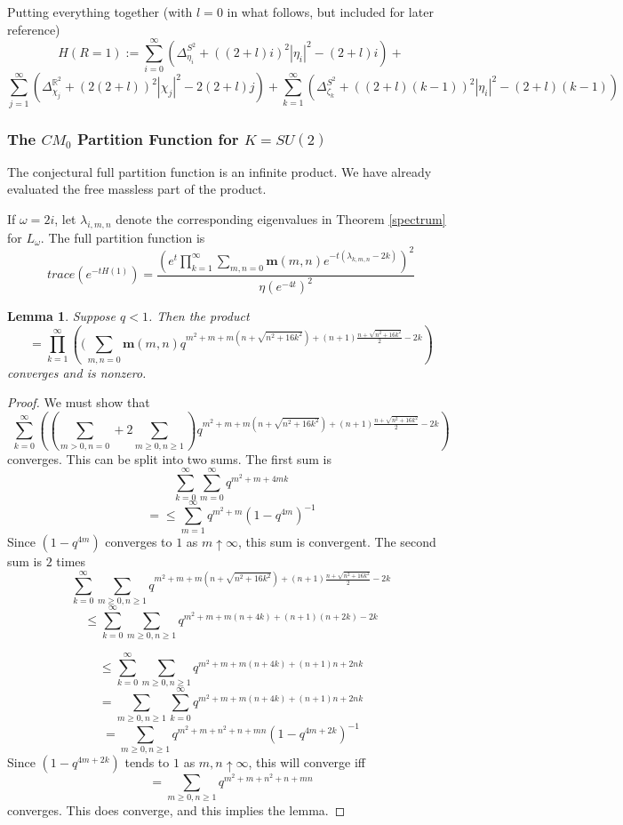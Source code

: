 \documentclass{amsart}
\newtheorem{lemma}{Lemma}
\theoremstyle{conjecture}
\theoremstyle{definition}
\theoremstyle{question}
\theoremstyle{questions}
\theoremstyle{remark}
\theoremstyle{remarks}
\theoremstyle{example}
\numberwithin{equation}{section}
\begin{document}
Putting everything together (with $l=0$ in what follows, but included for later reference)
\begin{equation}\label{SigmaHamiltonian}H(R=1):=\sum_{i=0}^{\infty}(\Delta^{S^2}_{\eta_i}+((2+l)i)^2|\eta_i|^2-(2+l)i)+
\end{equation}
$$
\sum_{j=1}^{\infty}(\Delta^{\mathbb R^2}_{\chi_j}+(2(2+l))^2|\chi_j|^2-2(2+l)j   )+
\sum_{k=1}^{\infty}(\Delta^{S^2}_{\zeta_k}+((2+l)(k-1))^2|\eta_i|^2-(2+l)(k-1))$$


\subsubsection{The $CM_0$ Partition Function for $K=SU(2)$}

The conjectural full partition function is an infinite product. We have already evaluated the free massless part of the product.

If $\omega=2i$, let $\lambda_{i,m,n}$ denote the corresponding eigenvalues
in Theorem \ref{spectrum} for $L_{\omega}$.
The full partition function is
$$trace(e^{-tH(1)})=\frac{\left(e^{t}\prod_{k=1}^{\infty}\sum_{m,n=0}\mathbf m(m,n)
e^{-t(\lambda_{k,m,n}-2k)}\right)^2}{\eta(e^{-4t})^2}$$

\begin{lemma} Suppose $q<1$. Then the product
$$=\prod_{k=1}^{\infty}\left((\sum_{m,n=0}\mathbf m(m,n)
q^{m^2+m+m(n+\sqrt{n^2+16k^2})+(n+1)\frac{n+\sqrt{n^2+16k^2}}{2}-2k}\right)$$
converges and is nonzero.
\end{lemma}


\begin{proof} We must show that
$$\sum_{k=0}^{\infty}\left((\sum_{m>0,n=0}+2\sum_{m\ge 0,n\ge 1})
q^{m^2+m+m(n+\sqrt{n^2+16k^2})+(n+1)\frac{n+\sqrt{n^2+16k^2}}{2}-2k}\right)$$
converges. This can be split into two sums. The first sum is
$$\sum_{k=0}^{\infty}\sum_{m=0}^{\infty}
q^{m^2+m+4mk}$$
$$=\le \sum_{m=1}^{\infty}q^{m^2+m}(1-q^{4m})^{-1}$$
Since $(1-q^{4m})$ converges to $1$ as $m\uparrow \infty$, this sum is convergent.
The second sum is $2$ times
$$\sum_{k=0}^{\infty}\sum_{m\ge 0,n\ge 1}
q^{m^2+m+m(n+\sqrt{n^2+16k^2})+(n+1)\frac{n+\sqrt{n^2+16k^2}}{2}-2k}$$
$$\le \sum_{k=0}^{\infty}\sum_{m\ge 0,n\ge 1}
q^{m^2+m+m(n+4k)+(n+1)(n+2k)-2k}$$

$$\le \sum_{k=0}^{\infty}\sum_{m\ge 0,n\ge 1}
q^{m^2+m+m(n+4k)+(n+1)n+2nk}$$
$$=\sum_{m\ge 0,n\ge 1} \sum_{k=0}^{\infty}
q^{m^2+m+m(n+4k)+(n+1)n+2nk}$$
$$=\sum_{m\ge 0,n\ge 1}
q^{m^2+m+n^2+n+mn}(1-q^{4m+2k})^{-1}$$
Since $(1-q^{4m+2k})$ tends to $1$ as $m,n\uparrow \infty$, this will converge
iff
$$=\sum_{m\ge 0,n\ge 1}
q^{m^2+m+n^2+n+mn}$$
converges. This does converge, and this implies the lemma.

\end{proof}
\end{document}
